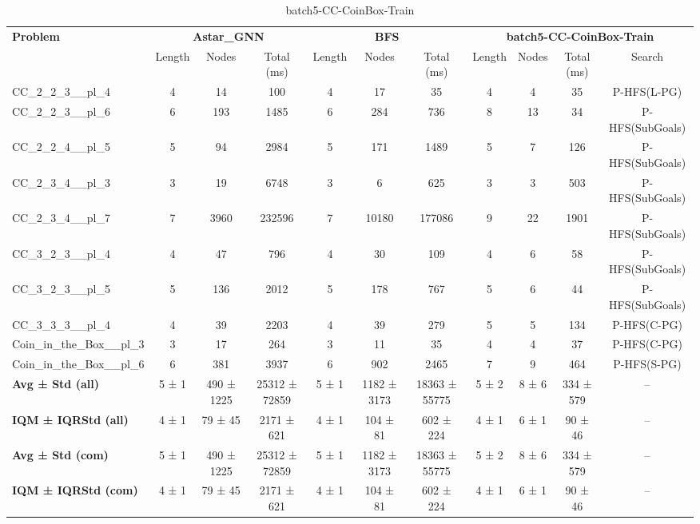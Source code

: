 \begin{table}[!ht]
\centering
\scriptsize
\begin{tabular}{l|ccc|ccc|cccc}
\multirow{2}{*}{\textbf{Problem}} & \multicolumn{3}{c|}{\textbf{Astar\_GNN}} & \multicolumn{3}{c|}{\textbf{BFS}} & \multicolumn{4}{c}{\textbf{batch5-CC-CoinBox-Train}} \\
\cline{2-11}
& Length & Nodes & Total (ms) & Length & Nodes & Total (ms) & Length & Nodes & Total (ms) & Search \\
\hline
CC\_2\_2\_3\_\_pl\_4 & 4 & 14 & 100 & 4 & 17 & 35 & 4 & 4 & 35 & P-HFS(L-PG) \\
CC\_2\_2\_3\_\_pl\_6 & 6 & 193 & 1485 & 6 & 284 & 736 & 8 & 13 & 34 & P-HFS(SubGoals) \\
CC\_2\_2\_4\_\_pl\_5 & 5 & 94 & 2984 & 5 & 171 & 1489 & 5 & 7 & 126 & P-HFS(SubGoals) \\
CC\_2\_3\_4\_\_pl\_3 & 3 & 19 & 6748 & 3 & 6 & 625 & 3 & 3 & 503 & P-HFS(SubGoals) \\
CC\_2\_3\_4\_\_pl\_7 & 7 & 3960 & 232596 & 7 & 10180 & 177086 & 9 & 22 & 1901 & P-HFS(SubGoals) \\
CC\_3\_2\_3\_\_pl\_4 & 4 & 47 & 796 & 4 & 30 & 109 & 4 & 6 & 58 & P-HFS(SubGoals) \\
CC\_3\_2\_3\_\_pl\_5 & 5 & 136 & 2012 & 5 & 178 & 767 & 5 & 6 & 44 & P-HFS(SubGoals) \\
CC\_3\_3\_3\_\_pl\_4 & 4 & 39 & 2203 & 4 & 39 & 279 & 5 & 5 & 134 & P-HFS(C-PG) \\
Coin\_in\_the\_Box\_\_pl\_3 & 3 & 17 & 264 & 3 & 11 & 35 & 4 & 4 & 37 & P-HFS(C-PG) \\
Coin\_in\_the\_Box\_\_pl\_6 & 6 & 381 & 3937 & 6 & 902 & 2465 & 7 & 9 & 464 & P-HFS(S-PG) \\
\hline
\textbf{Avg ± Std (all)} & 5 ± 1 & 490 ± 1225 & 25312 ± 72859 & 5 ± 1 & 1182 ± 3173 & 18363 ± 55775 & 5 ± 2 & 8 ± 6 & 334 ± 579 & -- \\
\textbf{IQM ± IQRStd (all)} & 4 ± 1 & 79 ± 45 & 2171 ± 621 & 4 ± 1 & 104 ± 81 & 602 ± 224 & 4 ± 1 & 6 ± 1 & 90 ± 46 & -- \\
\textbf{Avg ± Std (com)} & 5 ± 1 & 490 ± 1225 & 25312 ± 72859 & 5 ± 1 & 1182 ± 3173 & 18363 ± 55775 & 5 ± 2 & 8 ± 6 & 334 ± 579 & -- \\
\textbf{IQM ± IQRStd (com)} & 4 ± 1 & 79 ± 45 & 2171 ± 621 & 4 ± 1 & 104 ± 81 & 602 ± 224 & 4 ± 1 & 6 ± 1 & 90 ± 46 & -- \\
\end{tabular}
\caption{batch5-CC-CoinBox-Train}
\label{tab:batch5_CC-CoinBox_comparison_train}
\end{table}
